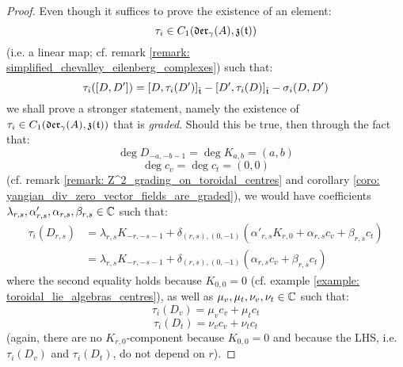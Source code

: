             \begin{proof}
                Even though it suffices to prove the existence of an element:
                    $$\tau_i \in C_1(\mathfrak{der}_{\gamma}(A), \mathfrak{z}(\mathfrak{t}))$$
                (i.e. a linear map; cf. remark \ref{remark: simplified_chevalley_eilenberg_complexes}) such that:
                    $$\tau_i([D, D']) = [D, \tau_i(D')]_{\hat{\mathfrak{t}}} - [D', \tau_i(D)]_{\hat{\mathfrak{t}}} - \sigma_i(D, D')$$
                we shall prove a stronger statement, namely the existence of $\tau_i \in C_1(\mathfrak{der}_{\gamma}(A), \mathfrak{z}(\mathfrak{t}))$ that is \textit{graded}. Should this be true, then through the fact that:
                    $$\deg D_{-a, -b - 1} = \deg K_{a, b} = (a, b)$$
                    $$\deg c_v = \deg c_t = (0, 0)$$
                (cf. remark \ref{remark: Z^2_grading_on_toroidal_centres} and corollary \ref{coro: yangian_div_zero_vector_fields_are_graded}), we would have coefficients $\lambda_{r, s}, \alpha'_{r, s}, \alpha_{r, s}, \beta_{r, s} \in \mathbb{C}$ such that:
                    $$
                        \begin{aligned}
                            \tau_i(D_{r, s}) & = \lambda_{r, s} K_{-r, -s - 1} + \delta_{(r, s), (0, -1)} ( \alpha'_{r, s} K_{r, 0} + \alpha_{r, s} c_v + \beta_{r, s} c_t )
                            \\
                            & = \lambda_{r, s} K_{-r, -s - 1} + \delta_{(r, s), (0, -1)} ( \alpha_{r, s} c_v + \beta_{r, s} c_t )
                        \end{aligned}
                    $$
                where the second equality holds because $K_{0, 0} = 0$ (cf. example \ref{example: toroidal_lie_algebras_centres}), as well as $\mu_v, \mu_t, \nu_v, \nu_t \in \mathbb{C}$ such that:
                    $$\tau_i(D_v) = \mu_v c_v + \mu_t c_t$$
                    $$\tau_i(D_t) = \nu_v c_v + \nu_t c_t$$
                (again, there are no $K_{r, 0}$-component because $K_{0, 0} = 0$ and because the LHS, i.e. $\tau_i(D_v)$ and $ \tau_i(D_t)$, do not depend on $r$).
                

\end{proof}
